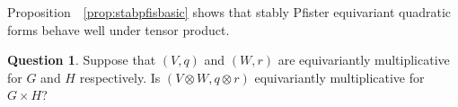 \documentclass[12pt]{amsart}
\numberwithin{equation}{section}
\theoremstyle{plain}
\theoremstyle{definition}
\newtheorem{ques}[prop]{Question}
\theoremstyle{remark}
\begin{document}
Proposition~~\ref{prop:stabpfisbasic} shows that stably Pfister equivariant quadratic forms behave well under tensor 
product. 


\begin{ques}
Suppose that $(V,q)$ and $(W,r)$ are equivariantly multiplicative for $G$ and $H$ respectively.  
Is $(V\otimes W, q\otimes r)$ equivariantly multiplicative for $G\times H$?
\end{ques}










\end{document}
